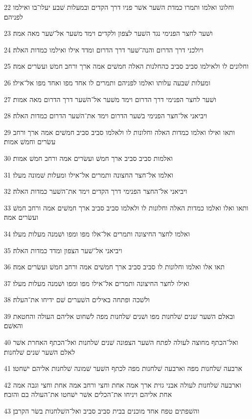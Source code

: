 \par 22 וחלונו ואלמו ותמרו כמדת השׁער אשׁר פניו דרך הקדים ובמעלות שׁבע יעלו־בו ואילמו לפניהם׃
\par 23 ושׁער לחצר הפנימי נגד השׁער לצפון ולקדים וימד משׁער אל־שׁער מאה אמה׃
\par 24 ויולכני דרך הדרום והנה־שׁער דרך הדרום ומדד אילו ואילמו כמדות האלה׃
\par 25 וחלונים לו ולאילמו סביב סביב כהחלנות האלה חמשׁים אמה ארך ורחב חמשׁ ועשׂרים אמה׃
\par 26 ומעלות שׁבעה עלותו ואלמו לפניהם ותמרים לו אחד מפו ואחד מפו אל־אילו׃
\par 27 ושׁער לחצר הפנימי דרך הדרום וימד משׁער אל־השׁער דרך הדרום מאה אמות׃
\par 28 ויביאני אל־חצר הפנימי בשׁער הדרום וימד את־השׁער הדרום כמדות האלה׃
\par 29 ותאו ואילו ואלמו כמדות האלה וחלונות לו ולאלמו סביב סביב חמשׁים אמה ארך ורחב עשׂרים וחמשׁ אמות׃
\par 30 ואלמות סביב סביב ארך חמשׁ ועשׂרים אמה ורחב חמשׁ אמות׃
\par 31 ואלמו אל־חצר החצונה ותמרים אל־אילו ומעלות שׁמונה מעלו׃
\par 32 ויביאני אל־החצר הפנימי דרך הקדים וימד את־השׁער כמדות האלה׃
\par 33 ותאו ואלו ואלמו כמדות האלה וחלונות לו ולאלמו סביב סביב ארך חמשׁים אמה ורחב חמשׁ ועשׂרים אמה׃
\par 34 ואלמו לחצר החיצונה ותמרים אל־אלו מפו ומפו ושׁמנה מעלות מעלו׃
\par 35 ויביאני אל־שׁער הצפון ומדד כמדות האלה׃
\par 36 תאו אלו ואלמו וחלונות לו סביב סביב ארך חמשׁים אמה ורחב חמשׁ ועשׂרים אמה׃
\par 37 ואילו לחצר החיצונה ותמרים אל־אילו מפו ומפו ושׁמנה מעלות מעלו׃
\par 38 ולשׁכה ופתחה באילים השׁערים שׁם ידיחו את־העלה׃
\par 39 ובאלם השׁער שׁנים שׁלחנות מפו ושׁנים שׁלחנות מפה לשׁחוט אליהם העולה והחטאת והאשׁם׃
\par 40 ואל־הכתף מחוצה לעולה לפתח השׁער הצפונה שׁנים שׁלחנות ואל־הכתף האחרת אשׁר לאלם השׁער שׁנים שׁלחנות׃
\par 41 ארבעה שׁלחנות מפה וארבעה שׁלחנות מפה לכתף השׁער שׁמונה שׁלחנות אליהם ישׁחטו׃
\par 42 וארבעה שׁלחנות לעולה אבני גזית ארך אמה אחת וחצי ורחב אמה אחת וחצי וגבה אמה אחת אליהם ויניחו את־הכלים אשׁר ישׁחטו את־העולה בם והזבח׃
\par 43 והשׁפתים טפח אחד מוכנים בבית סביב סביב ואל־השׁלחנות בשׂר הקרבן׃
